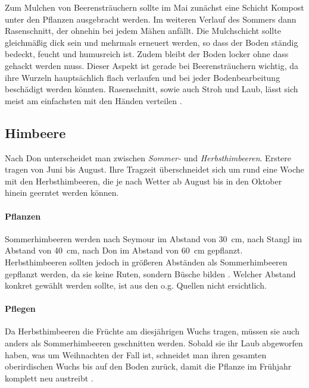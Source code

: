 Zum Mulchen von Beerensträuchern sollte im Mai zunächst eine Schicht Kompost unter den Pflanzen ausgebracht werden.
Im weiteren Verlauf des Sommers dann Rasenschnitt, der ohnehin bei jedem Mähen anfällt.
Die Mulchschicht sollte gleichmäßig dick sein und mehrmals erneuert werden, so dass der Boden ständig bedeckt, feucht und humusreich ist.
Zudem bleibt der Boden locker ohne dass gehackt werden muss.
Dieser Aspekt ist gerade bei Beerensträuchern wichtig, da ihre Wurzeln hauptsächlich flach verlaufen und bei jeder Bodenbearbeitung beschädigt werden könnten.
Rasenschnitt, sowie auch Stroh und Laub, lässt sich meist am einfachsten mit den Händen verteilen \cite[S.~45]{Heberer2018}.

\subsection{Himbeere}
\label{Himbeere}

Nach Don \cite[S.~420]{Don2021} unterscheidet man zwischen \textit{Sommer-} und \textit{Herbsthimbeeren}.
Erstere tragen von Juni bis August.
Ihre Tragzeit überschneidet sich um rund eine Woche mit den Herbsthimbeeren, die je nach Wetter ab August bis in den Oktober hinein geerntet werden können.

\paragraph{Pflanzen}

Sommerhimbeeren werden nach Seymour \cite[S.~175]{Seymour1978} im Abstand von 30~cm, nach Stangl \cite[S.~XY]{Stangl1995} im Abstand von 40~cm, nach Don \cite[S.~420]{Don2021} im Abstand von 60~cm gepflanzt.
Herbsthimbeeren sollten jedoch in größeren Abständen als Sommerhimbeeren gepflanzt werden, da sie keine Ruten, sondern Büsche bilden \cite[S.~420]{Don2021}.
Welcher Abstand konkret gewählt werden sollte, ist aus den o.g. Quellen nicht ersichtlich.

\paragraph{Pflegen}

Da Herbsthimbeeren die Früchte am diesjährigen Wuchs tragen, müssen sie auch anders als Sommerhimbeeren geschnitten werden.
Sobald sie ihr Laub abgeworfen haben, was um Weihnachten der Fall ist, schneidet man ihren gesamten oberirdischen Wuchs bis auf den Boden zurück, damit die Pflanze im Frühjahr komplett neu austreibt \cite[S.~421]{Don2021}.

